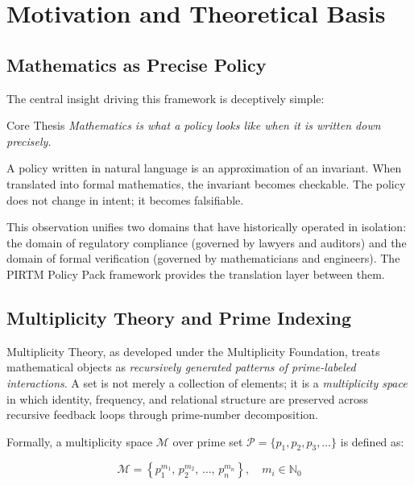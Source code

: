 \documentclass[12pt,letterpaper]{article}
\theoremstyle{definition}
\theoremstyle{plain}
\theoremstyle{remark}
\begin{document}
\section{Motivation and Theoretical Basis}
\label{sec:motivation}

\subsection{Mathematics as Precise Policy}
\label{subsec:mathaspolicy}

The central insight driving this framework is deceptively simple:

\begin{policybox}{Core Thesis}
\textit{Mathematics is what a policy looks like when it is written down
precisely.}

A policy written in natural language is an approximation of an invariant. When
translated into formal mathematics, the invariant becomes checkable. The policy
does not change in intent; it becomes falsifiable.
\end{policybox}

This observation unifies two domains that have historically operated in
isolation: the domain of regulatory compliance (governed by lawyers and auditors)
and the domain of formal verification (governed by mathematicians and engineers).
The PIRTM Policy Pack framework provides the translation layer between them.

\subsection{Multiplicity Theory and Prime Indexing}

Multiplicity Theory, as developed under the Multiplicity Foundation, treats
mathematical objects as \emph{recursively generated patterns of prime-labeled
interactions}. A set is not merely a collection of elements; it is a
\emph{multiplicity space} in which identity, frequency, and relational structure
are preserved across recursive feedback loops through prime-number decomposition.

Formally, a multiplicity space $\mathcal{M}$ over prime set
$\mathcal{P} = \{p_1, p_2, p_3, \ldots\}$ is defined as:

\begin{equation}
\mathcal{M} = \left\{ p_1^{m_1},\, p_2^{m_2},\, \ldots,\, p_n^{m_n} \right\},
\quad m_i \in \mathbb{N}_0
\label{eq:mspace}
\end{equation}
\end{document}
